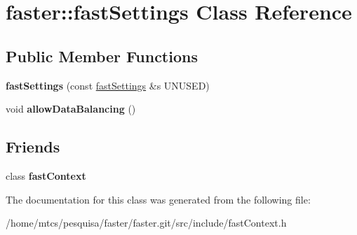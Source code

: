 \hypertarget{classfaster_1_1fastSettings}{}\section{faster\+:\+:fast\+Settings Class Reference}
\label{classfaster_1_1fastSettings}
\subsection*{Public Member Functions}
\begin{DoxyCompactItemize}
\item 
\hypertarget{classfaster_1_1fastSettings_ae63a2b5a6accbf3600bc9ac659269532}{}{\bfseries fast\+Settings} (const \hyperlink{classfaster_1_1fastSettings}{fast\+Settings} \&s U\+N\+U\+S\+E\+D)\label{classfaster_1_1fastSettings_ae63a2b5a6accbf3600bc9ac659269532}

\item 
\hypertarget{classfaster_1_1fastSettings_a33acd4169431c784d12bf960cacda6ed}{}void {\bfseries allow\+Data\+Balancing} ()\label{classfaster_1_1fastSettings_a33acd4169431c784d12bf960cacda6ed}

\end{DoxyCompactItemize}
\subsection*{Friends}
\begin{DoxyCompactItemize}
\item 
\hypertarget{classfaster_1_1fastSettings_a8ffe9636e25b4912700710d5fd2b5a2a}{}class {\bfseries fast\+Context}\label{classfaster_1_1fastSettings_a8ffe9636e25b4912700710d5fd2b5a2a}

\end{DoxyCompactItemize}


The documentation for this class was generated from the following file\+:\begin{DoxyCompactItemize}
\item 
/home/mtcs/pesquisa/faster/faster.\+git/src/include/fast\+Context.\+h\end{DoxyCompactItemize}
